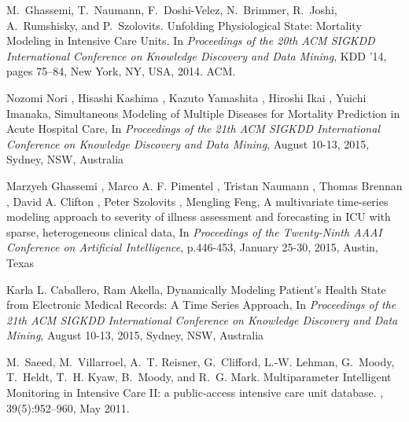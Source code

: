 \documentclass[journal]{IEEEtran}
\begin{document}
%
%
\begin{thebibliography}{1}

M.~Ghassemi, T.~Naumann, F.~Doshi-Velez, N.~Brimmer, R.~Joshi, A.~Rumshisky,
  and P.~Szolovits.
\newblock Unfolding {Physiological} {State}: {Mortality} {Modeling} in
  {Intensive} {Care} {Units}.
\newblock In {\em Proceedings of the 20th {ACM} {SIGKDD} {International}
  {Conference} on {Knowledge} {Discovery} and {Data} {Mining}}, {KDD} '14,
  pages 75--84, New York, NY, USA, 2014. ACM.

Nozomi Nori , Hisashi Kashima , Kazuto Yamashita , Hiroshi Ikai , Yuichi Imanaka,
\newblock Simultaneous Modeling of Multiple Diseases for Mortality Prediction in Acute Hospital Care,
\newblock In {\em Proceedings of the 21th {ACM} {SIGKDD} {International} {Conference} on {Knowledge} {Discovery}
and {Data} {Mining}}, August 10-13, 2015, Sydney, NSW, Australia

Marzyeh Ghassemi , Marco A. F. Pimentel , Tristan Naumann , Thomas Brennan , David A. Clifton , Peter Szolovits , Mengling Feng,
\newblock A multivariate time-series modeling approach to severity of illness assessment and forecasting in ICU with sparse, heterogeneous clinical data,
\newblock In {\em {Proceedings} of the {Twenty-Ninth} {AAAI} {Conference} on {Artificial} {Intelligence}}, p.446-453, January 25-30, 2015, Austin, Texas

Karla L. Caballero, Ram Akella,
\newblock Dynamically Modeling Patient's Health State from Electronic Medical Records: A Time Series Approach,
\newblock In {\em {Proceedings} of the {21th} {ACM} {SIGKDD} {International} {Conference} on {Knowledge} {Discovery}
and {Data} {Mining}}, August 10-13, 2015, Sydney, NSW, Australia



M.~Saeed, M.~Villarroel, A.~T. Reisner, G.~Clifford, L.-W. Lehman, G.~Moody,
  T.~Heldt, T.~H. Kyaw, B.~Moody, and R.~G. Mark.
\newblock Multiparameter {Intelligent} {Monitoring} in {Intensive} {Care} {II}:
  a public-access intensive care unit database.
, 39(5):952--960, May 2011.


\end{thebibliography}
\end{document}
